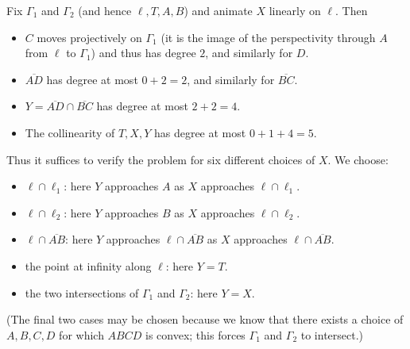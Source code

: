\begin{solution}
    Fix $\Gamma_1$ and $\Gamma_2$ (and hence $\ell, T, A, B$) and animate $X$
    linearly on $\ell$. Then

    \begin{itemize}
        \item $C$ moves projectively on $\Gamma_1$ (it is the image of the
            perspectivity through $A$ from $\ell$ to $\Gamma_1$) and thus has
            degree $2$, and similarly for $D$.
        \item $\overline{AD}$ has degree at most $0+2=2$, and similarly for
            $\overline{BC}$.
        \item $Y=\overline{AD}\cap\overline{BC}$ has degree at most $2+2=4.$
        \item The collinearity of $T,X,Y$ has degree at most $0+1+4=5.$
    \end{itemize}

    Thus it suffices to verify the problem for six different choices of $X$.
    We choose:

    \begin{itemize}
        \item $\ell\cap \ell_1$: here $Y$ approaches $A$ as $X$ approaches
            $\ell\cap \ell_1$.
        \item $\ell\cap\ell_2$: here $Y$ approaches $B$ as $X$ approaches
            $\ell\cap \ell_2$.
        \item $\ell\cap \overline{AB}$: here $Y$ approaches $\ell\cap
            \overline{AB}$ as $X$ approaches $\ell\cap \overline{AB}$.
        \item the point at infinity along $\ell$: here $Y=T$.
        \item the two intersections of $\Gamma_1$ and $\Gamma_2$: here $Y=X$.
    \end{itemize}

    (The final two cases may be chosen because we know that there exists a
    choice of $A,B,C,D$ for which $ABCD$ is convex; this forces $\Gamma_1$ and
    $\Gamma_2$ to intersect.)
\end{solution}



